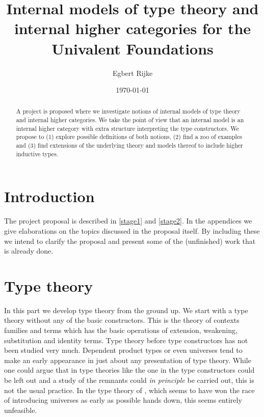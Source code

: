 \documentclass{article}
\title{Internal models of type theory and internal higher categories for the
Univalent Foundations}
\author{Egbert Rijke}
\date{\today}
\begin{document}
\maketitle

\begin{abstract}
A project is proposed where we investigate notions of internal models of type
theory and internal higher categories. We take the point of view that an
internal model is an internal higher category with extra structure interpreting
the type constructors. We propose to (1) explore possible definitions of both
notions, (2) find a zoo of examples and (3) find extensions of the underlying
theory and models thereof to include higher inductive types.
\end{abstract}

\tableofcontents

\part{Introduction}
The project proposal is described in \autoref{stage1} and \autoref{stage2}. In
the appendices we give elaborations on the topics discussed in the proposal itself.
By including these we intend to clarify the proposal and present some of the 
(unfinished) work that is already done.





%

\part{Type theory}

In this part we develop type theory from the ground up. We start with a type
theory without any of the basic constructors. This is the theory of contexts
families and terms which has the basic operations of extension, weakening,
substitution and identity terms. Type theory before type constructors has not
been studied very much. Dependent product types or even universes tend to make
an early appearance in just about any presentation of type theory. While one
could argue that in type theories like the one in \cite{Dybjer1996} the type
constructors could be left out and a study of the remnants could \emph{in
principle} be carried out, this is not the usual practice. In the type theory
of \cite{TheBook}, which seems to have won the race of introducing universes
as early as possible hands down, this seems entirely unfeasible.
\end{document}
